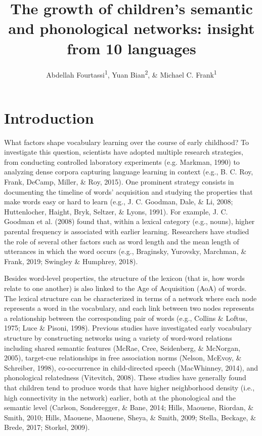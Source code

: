 \documentclass[english,floatsintext,man]{apa6}
\title{The growth of children's semantic and phonological networks: insight
from 10 languages}
\author{Abdellah Fourtassi\textsuperscript{1}, Yuan Bian\textsuperscript{2}, \& Michael C. Frank\textsuperscript{1}}
\affiliation{
    \vspace{0.5cm}
          \textsuperscript{1} Department of Psychology, Stanford University\\
          \textsuperscript{2} Department of Brain and Cognitive Sciences, Massachusetts Institute of
Technology  }
\theoremstyle{definition}
\theoremstyle{definition}
\theoremstyle{definition}
\theoremstyle{remark}
\begin{document}
\maketitle

\setcounter{secnumdepth}{0}



\section{Introduction}\label{introduction}

What factors shape vocabulary learning over the course of early
childhood? To investigate this question, scientists have adopted
multiple research strategies, from conducting controlled laboratory
experiments (e.g. Markman, 1990) to analyzing dense corpora capturing
language learning in context (e.g., B. C. Roy, Frank, DeCamp, Miller, \&
Roy, 2015). One prominent strategy consists in documenting the timeline
of words' acquisition and studying the properties that make words easy
or hard to learn (e.g., J. C. Goodman, Dale, \& Li, 2008; Huttenlocher,
Haight, Bryk, Seltzer, \& Lyons, 1991). For example, J. C. Goodman et
al. (2008) found that, within a lexical category (e.g., nouns), higher
parental frequency is associated with earlier learning. Researchers have
studied the role of several other factors such as word length and the
mean length of utterances in which the word occurs (e.g., Braginsky,
Yurovsky, Marchman, \& Frank, 2019; Swingley \& Humphrey, 2018).

Besides word-level properties, the structure of the lexicon (that is,
how words relate to one another) is also linked to the Age of
Acquisition (AoA) of words. The lexical structure can be characterized
in terms of a network where each node represents a word in the
vocabulary, and each link between two nodes represents a relationship
between the corresponding pair of words (e.g., Collins \& Loftus, 1975;
Luce \& Pisoni, 1998). Previous studies have investigated early
vocabulary structure by constructing networks using a variety of
word-word relations including shared semantic features (McRae, Cree,
Seidenberg, \& McNorgan, 2005), target-cue relationships in free
association norms (Nelson, McEvoy, \& Schreiber, 1998), co-occurrence in
child-directed speech (MacWhinney, 2014), and phonological relatedness
(Vitevitch, 2008). These studies have generally found that children tend
to produce words that have higher neighborhood density (i.e., high
connectivity in the network) earlier, both at the phonological and the
semantic level (Carlson, Sonderegger, \& Bane, 2014; Hills, Maouene,
Riordan, \& Smith, 2010; Hills, Maouene, Maouene, Sheya, \& Smith, 2009;
Stella, Beckage, \& Brede, 2017; Storkel, 2009).
\end{document}
